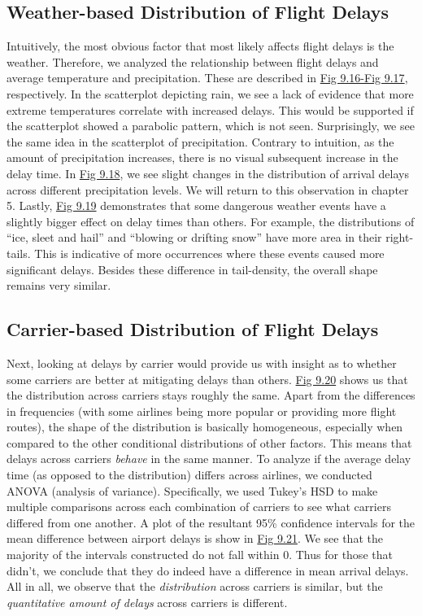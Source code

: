 \documentclass[12pt, a4paper, openany]{book}
\newcommand\tab[1][1cm]{\hspace*{#1}}
\begin{document}
		\subsection{Weather-based Distribution of Flight Delays}

	\tab Intuitively, the most obvious factor that most likely affects flight delays is the weather. Therefore, we analyzed the relationship between flight delays and average temperature and precipitation. These are described in \underline{Fig 9.16-Fig 9.17}, respectively. In the scatterplot depicting rain, we see a lack of evidence that more extreme temperatures correlate with increased delays. This would be supported if the scatterplot showed a parabolic pattern, which is not seen. Surprisingly, we see the same idea in the scatterplot of precipitation. Contrary to intuition, as the amount of precipitation increases, there is no visual subsequent increase in the delay time. In \underline{Fig 9.18}, we see slight changes in the distribution of arrival delays across different precipitation levels. We will return to this observation in chapter 5. Lastly, \underline{Fig 9.19} demonstrates that some dangerous weather events have a slightly bigger effect on delay times than others. For example, the distributions of “ice, sleet and hail” and “blowing or drifting snow” have more area in their right-tails. This is indicative of more occurrences where these events caused more significant delays. Besides these difference in tail-density, the overall shape remains very similar. \\
		\subsection{Carrier-based Distribution of Flight Delays}
			
			\tab Next, looking at delays by carrier would provide us with insight as to whether some carriers are better at mitigating delays than others. \underline{Fig 9.20} shows us that the distribution across carriers stays roughly the same. Apart from the differences in frequencies (with some airlines being more popular or providing more flight routes), the shape of the distribution is basically homogeneous, especially when compared to the other conditional distributions of other factors. This means that delays across carriers \textit{behave} in the same manner. To analyze if the average delay time (as opposed to the distribution) differs across airlines, we conducted ANOVA (analysis of variance). Specifically, we used Tukey’s HSD to make multiple comparisons across each combination of carriers to see what carriers differed from one another. A plot of the resultant 95\% confidence intervals for the mean difference between airport delays is show in \underline{Fig 9.21}. We see that the majority of the intervals constructed do not fall within 0. Thus for those that didn’t, we conclude that they do indeed have a difference in mean arrival delays. All in all, we observe that the \textit{distribution} across carriers is similar, but the \textit{quantitative amount of delays} across carriers is different. \\
\end{document}
